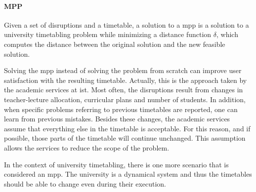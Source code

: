 \documentclass[twocolumn,natbib]{svjour3}          %
\begin{document}
\paragraph{MPP}
Given a set of disruptions and a timetable, a solution to a \acrlong{mpp} is a solution to a university timetabling problem while minimizing a distance function $\delta$, which  computes the distance between the original solution and the new feasible solution.

Solving the \gls{mpp} instead of solving the problem from scratch can improve user satisfaction with the resulting timetable. Actually, this is the approach taken by the academic services at \gls{ist}. Most often, the disruptions result from changes in teacher-lecture allocation, curricular plans and number of students. In addition, when specific problems referring to previous timetables are reported, one can learn from previous mistakes. Besides these changes, the academic services assume that everything else in the timetable is acceptable. For this reason, and if possible, those parts of the timetable will continue unchanged. This assumption allows the services to reduce the scope of the problem. 

In the context of university timetabling, there is one more scenario that is considered an \gls{mpp}. The university is a dynamical system and thus the timetables should be able to change even during their execution.  
\end{document}
